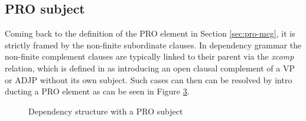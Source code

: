 \subsection{PRO subject}
    Coming back to the definition of the PRO element in Section \ref{sec:pro-mcg}, it is strictly framed by the non-finite subordinate clauses. In dependency grammar the non-finite complement clauses are typically linked to their parent via the \textit{xcomp} relation, which is defined in \cite{Marneffe2008} as introducing an open clausal complement of a VP or ADJP without its own subject. Such cases can then can be resolved by intro ducting a PRO element as can be seen in Figure \ref{fig:xcomp-ex}.

    
    \begin{figure}[!ht]
        \centering
        \begin{subfigure}[t]{0.42\linewidth}
            \caption{}
            \label{fig:xcomp-ex1}
        \end{subfigure}
        \begin{subfigure}[t]{0.578\linewidth}
            \caption{}
            \label{fig:xcomp-ex2}
        \end{subfigure}
        \caption{Dependency structure with a PRO subject}
        \label{fig:xcomp-ex}
    \end{figure}


